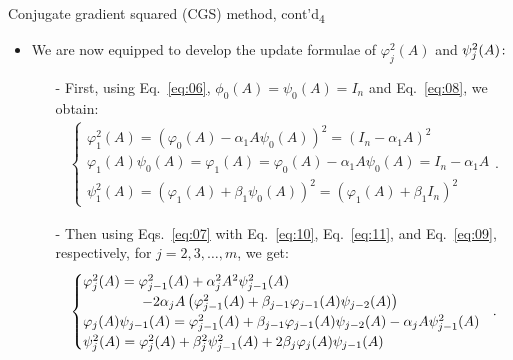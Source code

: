 \documentclass[t,usepdftitle=false]{beamer}
\begin{document}
\begin{frame}{Conjugate gradient squared (CGS) method, cont'd\textsubscript{4}}
\begin{itemize}
\item We are now equipped to develop the update formulae of $\varphi_j^{2}(A)$ and $\psi_j^2(A)\!:\hspace{-1cm}$
\begin{itemize}\normalsize
\item[-] First, using Eq.~\eqref{eq:06}, $\phi_0(A)=\psi_0(A)=I_n$ and Eq.~\eqref{eq:08}, we obtain:
\begin{align*}
\begin{cases}
\varphi_1^2(A)=(\varphi_0(A)-\alpha_1A\psi_0(A))^2=(I_n-\alpha_1A)^2\\
\varphi_1(A)\psi_0(A)=\varphi_1(A)=\varphi_0(A)-\alpha_1A\psi_0(A)=I_n-\alpha_1A\\
\psi_1^2(A)=(\varphi_1(A)+\beta_1\psi_0(A))^2=(\varphi_1(A)+\beta_1I_n)^2
\end{cases}\!\!.
\end{align*}
\item[-] Then using Eqs.~\eqref{eq:07} with Eq.~\eqref{eq:10}, Eq.~\eqref{eq:11}, and Eq.~\eqref{eq:09}, respectively, for $j=2,3,\dots,m$, we get:
\begin{align*}
\begin{cases}
\varphi_j^2(A)=\varphi_{j-1}^2(A)+\alpha_j^2A^2\psi^2_{j-1}(A)\\
\hspace{1.48cm}-2\alpha_jA\left(\varphi_{j-1}^2(A)+\beta_{j-1}\varphi_{j-1}(A)\psi_{j-2}(A)\right)\\
\varphi_j(A)\psi_{j-1}(A)=\varphi_{j-1}^2(A)+\beta_{j-1}\varphi_{j-1}(A)\psi_{j-2}(A)-\alpha_{j}A\psi_{j-1}^2(A)\\
\psi^2_j(A)=\varphi_j^2(A)+\beta_j^2\psi_{j-1}^2(A)+2\beta_j\varphi_j(A)\psi_{j-1}(A)
\end{cases}\!\!.
\end{align*}
\end{itemize}
\end{itemize}
\end{frame}
\end{document}
